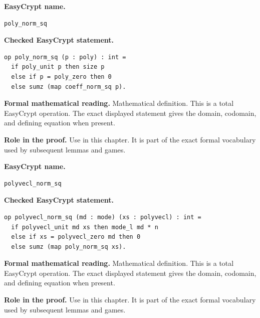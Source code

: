 \begin{formaldefinition}
\noindent\textbf{EasyCrypt name.}
\begin{lstlisting}[language=EasyCrypt,basicstyle=\ttfamily\scriptsize]
poly_norm_sq
\end{lstlisting}
\noindent\textbf{Checked EasyCrypt statement.}
\begin{lstlisting}[language=EasyCrypt,basicstyle=\ttfamily\scriptsize]
op poly_norm_sq (p : poly) : int =
  if poly_unit p then size p
  else if p = poly_zero then 0
  else sumz (map coeff_norm_sq p).
\end{lstlisting}
\noindent\textbf{Formal mathematical reading.}
Mathematical definition. This is a total EasyCrypt operation.  The exact displayed statement gives the domain, codomain, and defining equation when present.

\noindent\textbf{Role in the proof.}
Use in this chapter. It is part of the exact formal vocabulary used by subsequent lemmas and games.

\end{formaldefinition}

\begin{formaldefinition}
\noindent\textbf{EasyCrypt name.}
\begin{lstlisting}[language=EasyCrypt,basicstyle=\ttfamily\scriptsize]
polyvecl_norm_sq
\end{lstlisting}
\noindent\textbf{Checked EasyCrypt statement.}
\begin{lstlisting}[language=EasyCrypt,basicstyle=\ttfamily\scriptsize]
op polyvecl_norm_sq (md : mode) (xs : polyvecl) : int =
  if polyvecl_unit md xs then mode_l md * n
  else if xs = polyvecl_zero md then 0
  else sumz (map poly_norm_sq xs).
\end{lstlisting}
\noindent\textbf{Formal mathematical reading.}
Mathematical definition. This is a total EasyCrypt operation.  The exact displayed statement gives the domain, codomain, and defining equation when present.

\noindent\textbf{Role in the proof.}
Use in this chapter. It is part of the exact formal vocabulary used by subsequent lemmas and games.

\end{formaldefinition}

